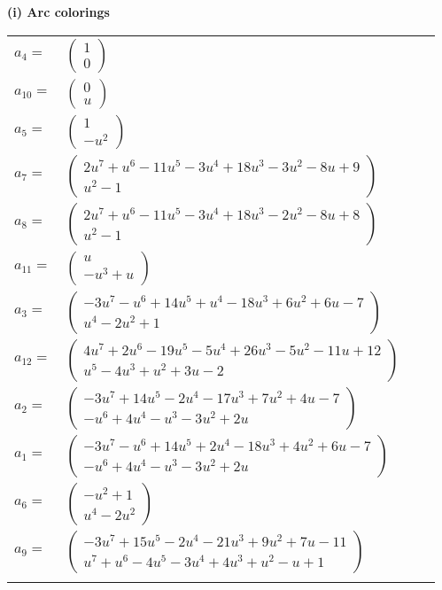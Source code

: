 \documentclass[1p]{elsarticle_modified}
\theoremstyle{definition}
\begin{document}
\flushleft \textbf{(i) Arc colorings}\\
\begin{tabular}{m{7pt} m{180pt} m{7pt} m{180pt} }
\flushright $a_{4}=$&$\begin{pmatrix}1\\0\end{pmatrix}$ \\
\flushright $a_{10}=$&$\begin{pmatrix}0\\u\end{pmatrix}$ \\
\flushright $a_{5}=$&$\begin{pmatrix}1\\- u^2\end{pmatrix}$ \\
\flushright $a_{7}=$&$\begin{pmatrix}2 u^7+u^6-11 u^5-3 u^4+18 u^3-3 u^2-8 u+9\\u^2-1\end{pmatrix}$ \\
\flushright $a_{8}=$&$\begin{pmatrix}2 u^7+u^6-11 u^5-3 u^4+18 u^3-2 u^2-8 u+8\\u^2-1\end{pmatrix}$ \\
\flushright $a_{11}=$&$\begin{pmatrix}u\\- u^3+u\end{pmatrix}$ \\
\flushright $a_{3}=$&$\begin{pmatrix}-3 u^7- u^6+14 u^5+u^4-18 u^3+6 u^2+6 u-7\\u^4-2 u^2+1\end{pmatrix}$ \\
\flushright $a_{12}=$&$\begin{pmatrix}4 u^7+2 u^6-19 u^5-5 u^4+26 u^3-5 u^2-11 u+12\\u^5-4 u^3+u^2+3 u-2\end{pmatrix}$ \\
\flushright $a_{2}=$&$\begin{pmatrix}-3 u^7+14 u^5-2 u^4-17 u^3+7 u^2+4 u-7\\- u^6+4 u^4- u^3-3 u^2+2 u\end{pmatrix}$ \\
\flushright $a_{1}=$&$\begin{pmatrix}-3 u^7- u^6+14 u^5+2 u^4-18 u^3+4 u^2+6 u-7\\- u^6+4 u^4- u^3-3 u^2+2 u\end{pmatrix}$ \\
\flushright $a_{6}=$&$\begin{pmatrix}- u^2+1\\u^4-2 u^2\end{pmatrix}$ \\
\flushright $a_{9}=$&$\begin{pmatrix}-3 u^7+15 u^5-2 u^4-21 u^3+9 u^2+7 u-11\\u^7+u^6-4 u^5-3 u^4+4 u^3+u^2- u+1\end{pmatrix}$\\&\end{tabular}
\end{document}
